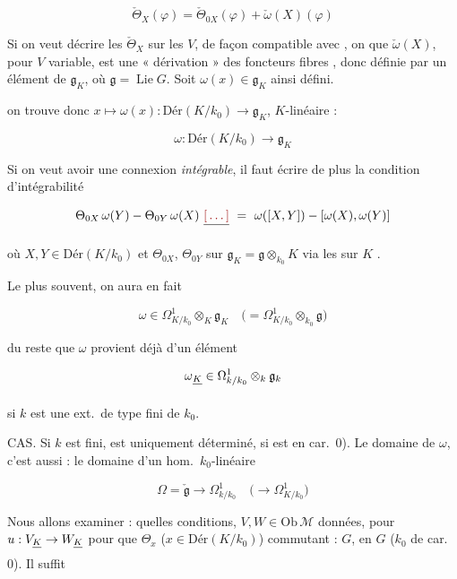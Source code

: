 \documentclass[11pt,a4paper]{article}
\begin{document}
\[ \check{\Theta}_{X}(\varphi) = \check{\Theta}_{0X}(\varphi) + \check{\omega}(X)(\varphi) \]

Si on veut décrire les $\check{\Theta}_{X}$ sur les $V$, de façon compatible
avec , on \ill{} que $\check{\omega}(X)$, pour $V$
variable,  est une « dérivation » des foncteurs fibres
, donc définie par un élément de $\mathfrak{g}_{K}$, où
$\mathfrak{g} = \operatorname{Lie} G$. Soit $\omega(x) \in \mathfrak{g}_{K}$
ainsi défini.


on trouve donc $x \mapsto \omega(x) : \text{Dér}(K/k_{0}) \to \mathfrak{g}_{K}$,
\ill{} $K$-linéaire :

\[ \omega : \text{Dér}(K/k_{0}) \longrightarrow \mathfrak{g}_{K} \]

Si on veut avoir une connexion \emph{intégrable}, il faut écrire de plus la
condition d'intégrabilité 

\[ \Theta_{0X}\, \omega(Y) - \Theta_{0Y}\, \omega(X) \ \struck{\ill{}} \ = \ \omega([X,Y]) - [\omega(X), \omega(Y)] \]

où \struck{\ill{}} $X, Y \in \text{Dér}(K/k_{0})$ et $\Theta_{0X}$,
$\Theta_{0Y}$  sur
$\mathfrak{g}_{K} = \mathfrak{g} \otimes_{k_{0}} K$ via les \ill{} sur $K$
\ill{}.

Le plus souvent, on aura en fait

\[ \omega \in \Omega^{1}_{K/k_{0}} \otimes_{K} \mathfrak{g}_{K} \quad
\bigl( = \Omega^{1}_{K/k_{0}} \otimes_{k_{0}} \mathfrak{g} \bigr) \]

du reste que $\omega$ provient déjà d'un élément

\[ \omega \struck{_{K}} \in \Omega^{1}_{k/k_{0}} \otimes_{k} \mathfrak{g}_{k} \]

si $k$ est une ext.\ de type fini de $k_{0}$.

CAS. Si $k$ est fini,  est uniquement déterminé, si \ill{} est
en car.\ $0$). Le domaine de $\omega$, c'est \ill{} aussi : le domaine d'un
\struck{\ill{}} hom.\ $k_{0}$-linéaire

\[ \Omega = \check{\mathfrak{g}} \longrightarrow \Omega^{1}_{k/k_{0}}
\quad \bigl( \longrightarrow \Omega^{1}_{K/k_{0}} \bigr) \]

Nous allons examiner : quelles conditions, \struck{\ill{}}
 $V, W \in \mathrm{Ob}\,\mathcal{M}$ données,  pour $u : V_{\struck{K}} \to W_{\struck{K}}$ \ill{} \struck{\ill{}} pour
que $\Theta_{x}$ ($x \in \text{Dér}(K/k_{0})$)  commutant : $G$,
en \struck{\ill{}} $G$  ($k_{0}$ de car.\ $0$). Il suffit
\end{document}

